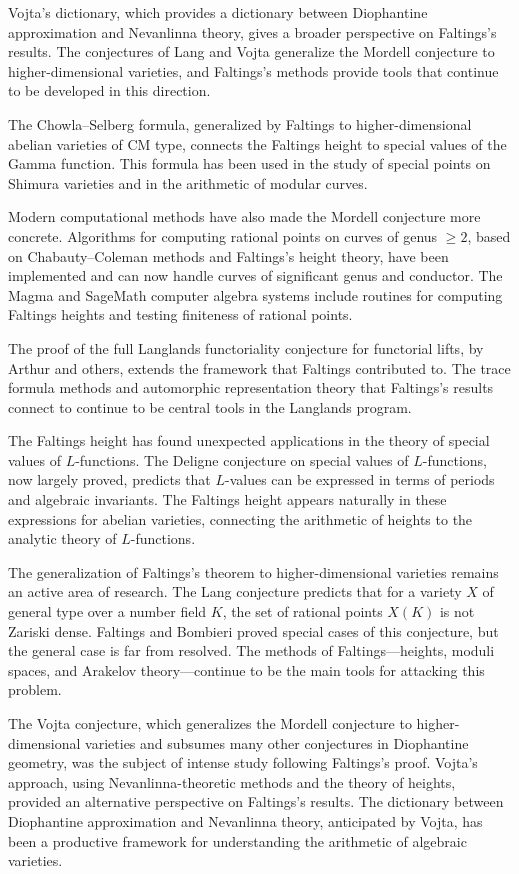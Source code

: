 Vojta's dictionary, which provides a dictionary between Diophantine approximation and Nevanlinna theory, gives a broader perspective on Faltings's results. The conjectures of Lang and Vojta generalize the Mordell conjecture to higher-dimensional varieties, and Faltings's methods provide tools that continue to be developed in this direction.

The Chowla--Selberg formula, generalized by Faltings to higher-dimensional abelian varieties of CM type, connects the Faltings height to special values of the Gamma function. This formula has been used in the study of special points on Shimura varieties and in the arithmetic of modular curves.

Modern computational methods have also made the Mordell conjecture more concrete. Algorithms for computing rational points on curves of genus $\geq 2$, based on Chabauty--Coleman methods and Faltings's height theory, have been implemented and can now handle curves of significant genus and conductor. The Magma and SageMath computer algebra systems include routines for computing Faltings heights and testing finiteness of rational points.

The proof of the full Langlands functoriality conjecture for functorial lifts, by Arthur and others, extends the framework that Faltings contributed to. The trace formula methods and automorphic representation theory that Faltings's results connect to continue to be central tools in the Langlands program.

The Faltings height has found unexpected applications in the theory of special values of $L$-functions. The Deligne conjecture on special values of $L$-functions, now largely proved, predicts that $L$-values can be expressed in terms of periods and algebraic invariants. The Faltings height appears naturally in these expressions for abelian varieties, connecting the arithmetic of heights to the analytic theory of $L$-functions.

The generalization of Faltings's theorem to higher-dimensional varieties remains an active area of research. The Lang conjecture predicts that for a variety $X$ of general type over a number field $K$, the set of rational points $X(K)$ is not Zariski dense. Faltings and Bombieri proved special cases of this conjecture, but the general case is far from resolved. The methods of Faltings---heights, moduli spaces, and Arakelov theory---continue to be the main tools for attacking this problem.

The Vojta conjecture, which generalizes the Mordell conjecture to higher-dimensional varieties and subsumes many other conjectures in Diophantine geometry, was the subject of intense study following Faltings's proof. Vojta's approach, using Nevanlinna-theoretic methods and the theory of heights, provided an alternative perspective on Faltings's results. The dictionary between Diophantine approximation and Nevanlinna theory, anticipated by Vojta, has been a productive framework for understanding the arithmetic of algebraic varieties.

